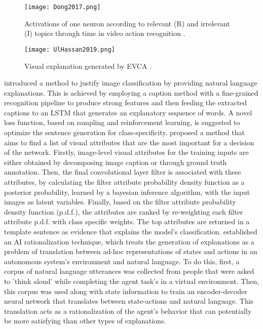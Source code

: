 \documentclass[journal]{IEEEtran}
\begin{document}
\begin{figure}
  \texttt{[image: Dong2017.png]}
  \caption{Activations of one neuron according to relevant (R) and irrelevant (I) topics through time in video action recognition \cite{Dong2017}.}
\end{figure}

\begin{figure}
  \texttt{[image: UlHassan2019.png]}
  \caption{Visual explanation generated by EVCA \cite{UlHassan2019}.}
\end{figure}

\cite{Hendricks2016} introduced a method to justify image classification by providing natural language explanations. This is achieved by employing a caption method with a fine-grained recognition pipeline to produce strong features and then feeding the extracted captions to an LSTM that generates an explanatory sequence of words. A novel loss function, based on sampling and reinforcement learning, is suggested to optimize the sentence generation for class-specificity. 
\cite{Guo2018} proposed a method that aims to find a list of visual attributes that are the most important for a decision of the network. Firstly, image-level visual attributes for the training inputs are either obtained by decomposing image caption or through ground truth annotation. Then, the final convolutional layer filter is associated with these attributes, by calculating the filter attribute probability density function as a posterior probability, learned by a bayesian inference algorithm, with the input images as latent variables. Finally, based on the filter attribute probability density function (p.d.f.), the attributes are ranked by re-weighting each filter attribute p.d.f. with class specific weights. The top attributes are returned in a template sentence as evidence that explains the model's classification. 
\cite{Ehsan2018} \cite{Ehsan2019} established an AI rationalization technique, which treats the generation of explanations as a problem of translation between ad-hoc representations of states and actions in an autonomous system’s environment and natural language. To do this, first, a corpus of natural language utterances was collected from people that were asked to 'think aloud' while completing the agent task’s in a virtual environment. Then, this corpus was used along with state information to train an encoder-decoder neural network that translates between state-actions and natural language. This translation acts as a rationalization of the agent's behavior that can potentially be more satisfying than other types of explanations. 
\end{document}
